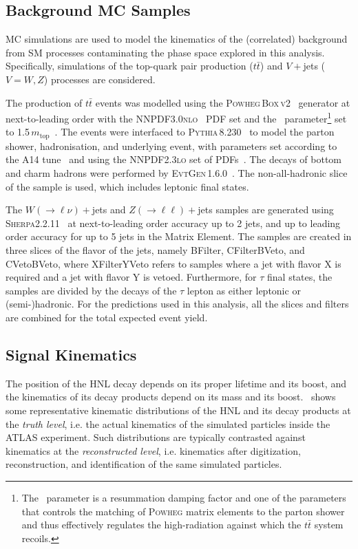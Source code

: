 \subsection*{Background MC Samples}
MC simulations are used to model the kinematics of the (correlated) background from SM processes contaminating the phase space explored in this analysis. Specifically, simulations of the top-quark pair production ($t\bar{t}$) and $V+$jets ($V=W,\xspace Z$) processes are considered.

The production of $t\bar{t}$ events was modelled using the \textsc{Powheg\,Box\,v2}~\cite{Frixione:2007nw,Nason:2004rx,Frixione:2007vw,Alioli:2010xd} generator at next-to-leading order with the \textsc{NNPDF3.0nlo}~\cite{Ball:2014uwa} PDF set and the \hdamp~parameter\footnote{The \hdamp~parameter is a resummation damping factor and one of the parameters that controls the matching of \textsc{Powheg} matrix elements to the parton shower and thus effectively regulates the high-\pT radiation against which the $t\bar{t}$ system recoils.} set to 1.5\,$m_{\mathrm{top}}$~\cite{ATL-PHYS-PUB-2016-020}.  The events were interfaced to \textsc{Pythia\,8.230}~\cite{Sjostrand:2014zea} to model the parton shower, hadronisation, and underlying event, with parameters set according to the A14 tune~\cite{ATL-PHYS-PUB-2014-021} and using the \textsc{NNPDF2.3lo} set of PDFs~\cite{Ball:2012cx}. The decays of bottom and charm hadrons were performed by \textsc{EvtGen\,1.6.0}~\cite{Lange:2001uf}. The non-all-hadronic slice of the sample is used, which includes leptonic final states.

The $W(\rightarrow \ell\nu)+$jets and $Z(\rightarrow \ell\ell)+$jets samples are generated using \textsc{Sherpa2.2.11}~\cite{Gleisberg:2008ta,Hoeche:2009rj,Bothmann:2019yzt} at next-to-leading order accuracy up to 2 jets, and up to leading order accuracy for up to 5 jets in the Matrix Element. The samples are created in three slices of the flavor of the jets, namely BFilter, CFilterBVeto, and CVetoBVeto, where XFilterYVeto refers to samples where a jet with flavor X is required and a jet with flavor Y is vetoed. Furthermore, for $\tau$ final states, the samples are divided by the decays of the $\tau$ lepton as either leptonic or (semi-)hadronic. For the predictions used in this analysis, all the slices and filters are combined for the total expected event yield.
 
\subsection{Signal Kinematics}
The position of the HNL decay depends on its proper lifetime and its boost, and the kinematics of its decay products depend on its mass and its boost.~ shows some representative kinematic distributions of the HNL and its decay products at the \textit{truth level}, i.e. the actual kinematics of the simulated particles inside the ATLAS experiment. Such distributions are typically contrasted against kinematics at the \textit{reconstructed level}, i.e. kinematics after digitization, reconstruction, and identification of the same simulated particles.

